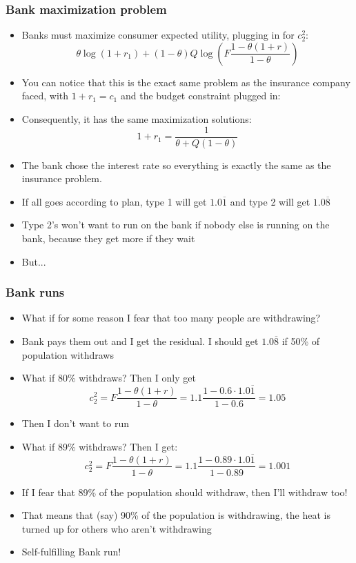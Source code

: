 \documentclass{beamer}
\begin{document}
\begin{frame}
\frametitle{Bank maximization problem}
\begin{itemize}
\item Banks must maximize consumer expected utility, plugging in for $c_2^2$:
$$\theta\log(1+r_1)+(1-\theta)Q\log\left(F\frac{1-\theta(1+r)}{1-\theta}\right)$$
\item You can notice that this is the exact same problem as the insurance company faced, with $1+r_1=c_1$ and the budget constraint plugged in:
\bigskip
\item Consequently, it has the same maximization solutions: 
$$1+r_1=\frac{1}{\theta+Q(1-\theta)}$$
\item The bank chose the interest rate so everything is exactly the same as the insurance problem.
\bigskip
\item If all goes according to plan, type 1 will get $1.0\overline{1}$ and type 2 will get $1.0\overline{8}$
\bigskip
\item Type 2's won't want to run on the bank if nobody else is running on the bank, because they get more if they wait
\bigskip
\item But...
\end{itemize}
\end{frame}


\begin{frame}
\frametitle{Bank runs}
\begin{itemize}
\item What if for some reason I fear that too many people are withdrawing?  
\smallskip
\item Bank pays them out and I get the residual.  I should get $1.0\overline{8}$ if 50\% of population withdraws
\smallskip
\item What if 80\% withdraws?  Then I only get 
$$c_2^2=F\frac{1-\theta(1+r)}{1-\theta}=1.1\frac{1-0.6\cdot 1.0\overline{1}}{1-0.6}=1.05$$
\item Then I don't want to run
\smallskip
\item What if 89\% withdraws?  Then I get:
$$c_2^2=F\frac{1-\theta(1+r)}{1-\theta}=1.1\frac{1-0.89\cdot 1.0\overline{1}}{1-0.89}=1.001$$
\item If I fear that 89\% of the population should withdraw, then I'll withdraw too!
\smallskip
\item That means that (say) 90\% of the population is withdrawing, the heat is turned up for others who aren't withdrawing
\smallskip
\item Self-fulfilling Bank run!
\end{itemize}
\end{frame}
\end{document}
